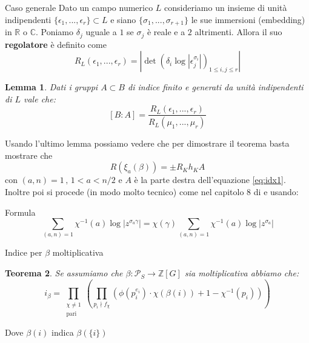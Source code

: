 \documentclass{beamer}
\theoremstyle{plain}
\newtheorem{teo}{Teorema}[section]
\newtheorem{lem}[teo]{Lemma}
\theoremstyle{remark}
\theoremstyle{definition}
\newcommand{\PS}{\mathcal{P}_S}
\newcommand{\Z}{\mathbb{Z}}
\newcommand{\C}{\mathbb{C}}
\newcommand{\R}{\mathbb{R}}
\begin{document}
	\begin{frame}{Caso generale}
		Dato un campo numerico $ L $ consideriamo un insieme di unità indipendenti $ \{\epsilon_1 , ... , \epsilon_r\} \subset L$ e siano $ \{ \sigma_1 , ... , \sigma_{r+1} \} $ le sue immersioni (embedding) in $ \R $ o $ \C $. Poniamo $ \delta_j $ uguale a $ 1 $ se $ \sigma_j $ è reale e a $ 2 $ altrimenti. Allora il suo \textbf{regolatore} è definito come 
		\[ 	R_L(\epsilon_1 , ... , \epsilon_r) = | \det (\delta_i \log | \epsilon_j ^{\sigma_i}|)_{1\leq i,j\leq r} | \]
		\pause
		\begin{lem}
				\label{lem:index_reg}
				Dati i gruppi $ A \subset B $ di indice finito e generati da unità indipendenti di $ L $ vale che:
				\begin{equation} \label{eq:index_reg}
					[B:A]= \frac{R_L(\epsilon_1 , ... , \epsilon_r) }{R_L(\mu_1 , ... , \mu_r) }
				\end{equation}
			\end{lem}
	\end{frame}
	
	\begin{frame}
		Usando l'ultimo lemma possiamo vedere che per dimostrare il teorema basta mostrare che 
		$$ R(\xi_a(\beta)) = \pm R_K h_K A $$
		con $ (a,n)=1 \, , \,1 < a <n/2 $ e $ A$ è la parte destra dell'equazione \ref{eq:idx1}.\pause \\
	
		Inoltre poi si procede (in modo molto tecnico) come nel capitolo 8 di \cite{CF} e usando:
		\begin{exampleblock}{Formula}
					\begin{equation} \label{eq:fact}
						\sum_{(a,n)=1} \chi ^{-1} (a) \log | z ^{\sigma_a \gamma }| = \chi (\gamma) \sum_{(a,n)=1} \chi ^{-1}(a) \log | z ^{\sigma_a  }|
					\end{equation}
		\end{exampleblock}
	\end{frame}
	
	\begin{frame}{Indice per $\beta$ moltiplicativa}
			\begin{teo}
				\label{teo:idx_m}
				Se assumiamo che $ \beta : \PS \to \Z[G] $ sia moltiplicativa abbiamo che:
				\begin{equation}\label{eq:idx_m}
					i_\beta =  \prod_{ \substack{\chi \neq 1 \\ \text{pari}}} \left( \prod_{p_i \nmid f_\chi} \left( \phi (p_i^{e_i}) \cdot \chi (\beta (i))  + 1- \chi^{-1} (p_i)\right)  \right) 
				\end{equation}
			\end{teo}
			Dove $ \beta(i) $ indica $ \beta (\{i\})$
	\end{frame}
	
\end{document}
